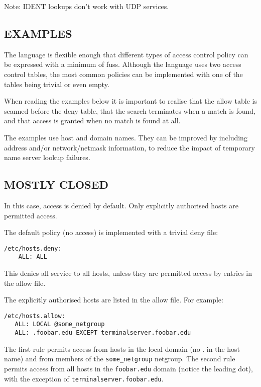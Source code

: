 \documentclass[11pt,twoside,onecolumn]{book}
\begin{document}
Note: IDENT lookups don't work with UDP services. 

\subsection*{EXAMPLES}

The language is flexible enough that different types of access control
policy can be expressed with a minimum of fuss. Although the language
uses two access control tables, the most common policies can be
implemented with one of the tables being trivial or even empty.

When reading the examples below it is important to realise that the
allow table is scanned before the deny table, that the search
terminates when a match is found, and that access is granted when no
match is found at all.

The examples use host and domain names. They can be improved by
including address and/or network/netmask information, to reduce the
impact of temporary name server lookup failures.

\subsection*{MOSTLY CLOSED}

In this case, access is denied by default. Only explicitly authorised
hosts are permitted access. 

The default policy (no access) is implemented with a trivial deny
file:

{\small
\begin{verbatim}
/etc/hosts.deny:
    ALL: ALL
\end{verbatim}
}

This denies all service to  all  hosts,  unless  they  are
permitted access by entries in the allow file.

The  explicitly  authorised  hosts are listed in the allow file.
For example:

{\small
\begin{verbatim}
/etc/hosts.allow:
   ALL: LOCAL @some_netgroup
   ALL: .foobar.edu EXCEPT terminalserver.foobar.edu
\end{verbatim}
}

The first rule permits access from hosts in the local domain (no .
in the host name) and from members of the {\tt some\_netgroup}
netgroup.  The second rule permits access from all hosts in the
{\tt foobar.edu} domain (notice the leading dot), with the exception of
{\tt terminalserver.foobar.edu}.
\end{document}
